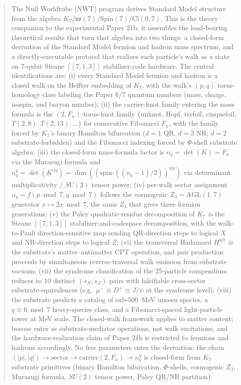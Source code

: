 \documentclass[11pt]{article}
\newcommand{\so}{\mathfrak{so}}
\newcommand{\Klogical}{[[7, 1, 3]]}
\begin{document}
\begin{abstract}
The Null Worldtube (NWT) program derives Standard Model structure from the algebra $K_7 /\allowbreak \so(7) /\allowbreak \mathrm{Spin}(7) /\allowbreak \mathrm{Cl}(0, 7)$.  This is the theory companion to the experimental Paper 21b; it assembles the load-bearing theoretical results that turn that algebra into two things: a closed-form derivation of the Standard Model fermion and hadron mass spectrum, and a directly-executable protocol that realizes each particle's walk as a state on $7$-qubit Steane $\Klogical$ stabilizer-code hardware.  The central identifications are: (i) every Standard Model fermion and hadron is a closed walk on the Heffter embedding of $K_7$, with the walk's $(p, q)$ torus-homology class labeling the Paper 6/7 quantum numbers (mass, charge, isospin, and baryon number); (ii) the carrier-knot family entering the mass formula is the $(2, F_n)$-torus-knot family $\{$unknot, Hopf, trefoil, cinquefoil, $T(2,8), T(2,13), \ldots\}$ for consecutive Fibonacci $F_n$, with the family forced by $K_7$'s binary Hamilton bifurcation ($d=1$ QR, $d=3$ NR; $d=2$ substrate-forbidden) and the Fibonacci indexing forced by $\Phi$-shell substrate algebra; (iii) the closed-form mass-formula factor is $n_q = \det(K) = F_n$ via the Murasugi formula and $n_q^q = \det(K^{\sqcup q}) = \dim((\mathrm{spin}\text{-}((n_q-1)/2))^{\otimes q})$ via determinant multiplicativity / $SU(2)$ tensor power; (iv) per-walk sector assignment $n_q = f(p \bmod 7, q \bmod 7)$ follows the cosmogenic $Z_3 = \mathrm{AGL}(1, 7)$ generator $x \mapsto 2x \bmod 7$, the same $Z_3$ that gives three fermion generations; (v) the Paley quadratic-residue decomposition of $K_7$ \emph{is} the Steane $\Klogical$ stabilizer-and-codespace decomposition, with the walk-to-Pauli direction-sensitive map sending QR-direction steps to logical $X$ and NR-direction steps to logical $Z$; (vi) the transversal Hadamard $H^{\otimes 7}$ \emph{is} the substrate's matter--antimatter CPT operation, and pair production proceeds by simultaneous reverse-traversal walk emission from substrate vacuum; (vii) the syndrome classification of the 25-particle compendium reduces to $10$ distinct $(s_X, s_Z)$ pairs with falsifiable cross-sector substrate-equivalences (e.g.\ $\mu^- \equiv D^+ \equiv J/\psi$ at the syndrome level); (viii) the substrate predicts a catalog of sub-$500$~MeV unseen species, a $q \equiv 6 \bmod 7$ heavy-species class, and a Fibonacci-spaced light-particle tower at MeV scale.  The closed-walk framework applies to matter content; bosons enter as substrate-mediator operations, not walk excitations, and the hardware-realization claim of Paper 21b is restricted to fermions and hadrons accordingly.  No free parameters enter the derivation: the chain $(|p|, |q|) \to \mathrm{sector} \to \mathrm{carrier}(2, F_n) \to n_q^q$ is closed-form from $K_7$ substrate primitives (binary Hamilton bifurcation, $\Phi$-shells, cosmogenic $Z_3$, Murasugi formula, $SU(2)$ tensor power, Paley QR/NR partition).
\end{abstract}
\end{document}
